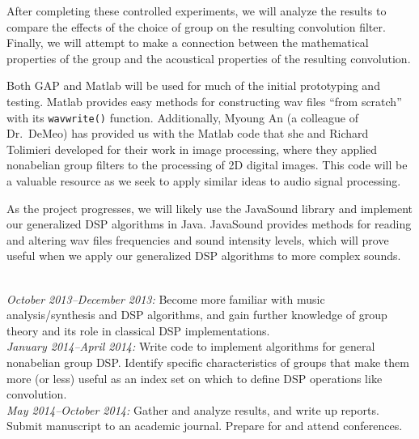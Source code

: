 \documentclass[10pt]{article}
\begin{document}
After completing these controlled experiments, we will analyze the results to
compare the effects of the choice of group on the resulting convolution filter.
Finally, we will attempt to make a connection between the mathematical
properties of the group and the acoustical properties of the resulting
convolution.  

Both GAP and Matlab will be used for much of the initial prototyping and
testing. Matlab provides easy methods for constructing wav files ``from 
scratch'' with its {\tt wavwrite()} function. Additionally, Myoung An (a colleague of
Dr.~DeMeo) has provided us with the Matlab code that she and Richard Tolimieri
developed for their work in image processing, where they applied nonabelian group
filters to the processing of 2D digital images. This code will be a valuable
resource as we seek to apply similar ideas to audio signal processing.  

As the project progresses, we will likely use the JavaSound library and
implement our generalized DSP algorithms in Java.  JavaSound provides methods
for reading and altering wav files frequencies and sound intensity levels, which
will prove useful when we apply our generalized DSP algorithms to more complex
sounds.

\vskip5mm

\\
{\it October 2013--December 2013:} Become more familiar with music
analysis/synthesis and DSP algorithms, and gain further knowledge of group
theory and its role in classical DSP implementations. 
\\[5pt]
{\it January 2014--April 2014:} Write code to implement algorithms for
general nonabelian group DSP.  
Identify specific characteristics of groups that make them more (or less)
useful as an index set on which to define DSP operations like convolution.
\\[5pt]
{\it May 2014--October 2014:} Gather and analyze results, and write up reports.  
Submit manuscript to an academic journal.  Prepare
for and attend conferences.
\end{document}

